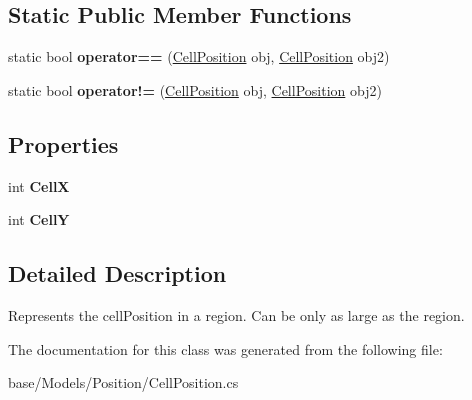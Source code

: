 \subsection*{Static Public Member Functions}
\begin{DoxyCompactItemize}
\item 
\hypertarget{classCore_1_1Models_1_1CellPosition_ab477073a5c715c0d25fa2499c7c9582f}{static bool {\bfseries operator==} (\hyperlink{classCore_1_1Models_1_1CellPosition}{Cell\-Position} obj, \hyperlink{classCore_1_1Models_1_1CellPosition}{Cell\-Position} obj2)}\label{classCore_1_1Models_1_1CellPosition_ab477073a5c715c0d25fa2499c7c9582f}

\item 
\hypertarget{classCore_1_1Models_1_1CellPosition_a922b6be828c0a7fa2fe1f340854d3d6f}{static bool {\bfseries operator!=} (\hyperlink{classCore_1_1Models_1_1CellPosition}{Cell\-Position} obj, \hyperlink{classCore_1_1Models_1_1CellPosition}{Cell\-Position} obj2)}\label{classCore_1_1Models_1_1CellPosition_a922b6be828c0a7fa2fe1f340854d3d6f}

\end{DoxyCompactItemize}
\subsection*{Properties}
\begin{DoxyCompactItemize}
\item 
\hypertarget{classCore_1_1Models_1_1CellPosition_a4daf526cdfe22a21d679d3e1b032d096}{int {\bfseries Cell\-X}}\label{classCore_1_1Models_1_1CellPosition_a4daf526cdfe22a21d679d3e1b032d096}

\item 
\hypertarget{classCore_1_1Models_1_1CellPosition_a91ba33cce7deac7d2ec875812c3f73dc}{int {\bfseries Cell\-Y}}\label{classCore_1_1Models_1_1CellPosition_a91ba33cce7deac7d2ec875812c3f73dc}

\end{DoxyCompactItemize}


\subsection{Detailed Description}
Represents the cell\-Position in a region. Can be only as large as the region. 



The documentation for this class was generated from the following file\-:\begin{DoxyCompactItemize}
\item 
base/\-Models/\-Position/Cell\-Position.\-cs\end{DoxyCompactItemize}
